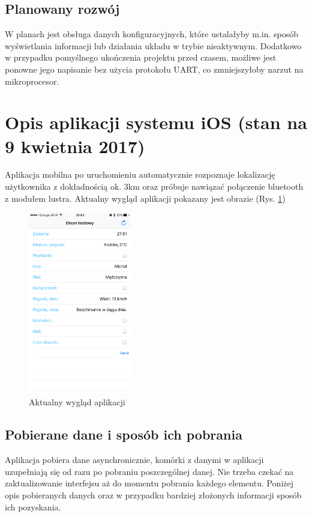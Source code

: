 \documentclass[a4paper,11pt]{article}
\begin{document}
\subsection{Planowany rozwój}
W planach jest obsługa danych konfiguracyjnych, które ustalałyby m.in. sposób wyświetlania informacji lub działania układu w trybie nieaktywnym. Dodatkowo w przypadku pomyślnego ukończenia projektu przed czasem, możliwe jest ponowne jego napisanie bez użycia protokołu UART, co zmniejszyłoby narzut na mikroprocesor.

\section{Opis aplikacji systemu iOS (stan na 9 kwietnia 2017)}

Aplikacja mobilna po uruchomieniu automatycznie rozpoznaje lokalizację użytkownika z dokładnością ok. 3km oraz próbuje nawiązać połączenie bluetooth z modułem lustra. Aktualny wygląd aplikacji pokazany jest obrazie (Rys. \ref{ios_main_screen})

\begin{figure}[H]
	\includegraphics[width=0.4\textwidth,center]{ios_main_scrren.png}
	\caption {Aktualny wygląd aplikacji}
	\label{ios_main_screen}
\end{figure}

\subsection{Pobierane dane i sposób ich pobrania}
Aplikacja pobiera dane asynchronicznie, komórki z danymi w aplikacji uzupełniają się od razu po pobraniu poszczególnej danej. Nie trzeba czekać na zaktualizowanie interfejsu aż do momentu pobrania każdego elementu. Poniżej opis pobieranych danych oraz w przypadku bardziej złożonych informacji sposób ich pozyskania.
\end{document}
